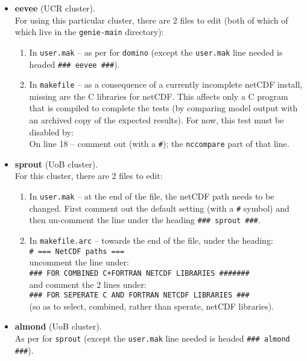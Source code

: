 \documentclass[11pt,fleqn]{book} %
\begin{document}
\begin{itemize}
\vspace{1mm}
\item \textbf{eevee} (UCR cluster).
\vspace{1mm}
\\ For using this particular cluster, there are 2 files to edit (both of which of which live in the \texttt{genie-main} directory):
\begin{enumerate}[noitemsep]
\item In \texttt{user.mak} -- as per for \texttt{domino} (except the \texttt{user.mak} line needed is headed \texttt{\#\#\# eevee \#\#\#}).
\item In \texttt{makefile} -- as a consequence of a currently incomplete netCDF install, missing are the C libraries for netCDF. This affects only a C program that is compiled to complete the tests (by comparing model output with an archived copy of the expected results). For now, this test must be disabled by:
\\On line 18 -- comment out (with a \texttt{\#}); the \texttt{nccompare} part of that line.
\end{enumerate}

\vspace{1mm}
\item \textbf{sprout} (UoB cluster). 
\vspace{1mm}
\\ For this cluster, there are 2 files to edit:
\begin{enumerate}[noitemsep]
\item In \texttt{user.mak} -- at the end of the file, the netCDF path needs to be changed. First comment out the default setting (with a \texttt{\#} symbol) and then un-comment the line under the heading \texttt{\#\#\# sprout \#\#\#}.
\item In \texttt{makefile.arc} -- towards the end of the file, under the heading:
\\\texttt{\# === NetCDF paths ===}
\\uncomment the line under:
\\\texttt{\#\#\# FOR COMBINED C+FORTRAN NETCDF LIBRARIES \#\#\#\#\#\#\#}
\\and comment the 2 lines under:
\\\texttt{\#\#\# FOR SEPERATE C AND FORTRAN NETCDF LIBRARIES \#\#\#}
\\(so as to select, combined, rather than sperate, netCDF libraries).
\end{enumerate}

\vspace{1mm}
\item \textbf{almond} (UoB cluster). 
\vspace{1mm}
\\ As per for \texttt{sprout} (except the \texttt{user.mak} line needed is headed \texttt{\#\#\# almond \#\#\#}).


\end{itemize}
\end{document}
